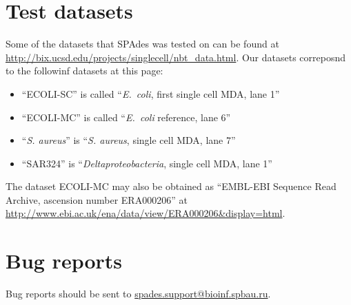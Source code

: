 \documentclass{article}
\def\spades{SPAdes}
\def\ecoli{\it E.~coli}
\begin{document}
\section{Test datasets}\label{sec:testdatasets}
Some of the datasets that {\spades} was tested on can be found at
\url{http://bix.ucsd.edu/projects/singlecell/nbt_data.html}.
Our datasets correposnd to the followinf datasets at this page:
\begin{itemize}
\item ``ECOLI-SC'' is called ``{\ecoli}, first single cell MDA, lane 1''
\item ``ECOLI-MC'' is called ``{\ecoli} reference, lane 6''
\item ``{\it S. aureus}'' is ``{\it S. aureus}, single cell MDA, lane 7''
\item ``SAR324'' is ``{\it Deltaproteobacteria}, single cell MDA, lane 1''
\end{itemize}
The dataset ECOLI-MC may also be obtained as
``EMBL-EBI Sequence Read Archive, ascension number ERA000206''
at \url{http://www.ebi.ac.uk/ena/data/view/ERA000206&display=html}.

\section{Bug reports}
Bug reports should be sent to \url{spades.support@bioinf.spbau.ru}.






\end{document}
